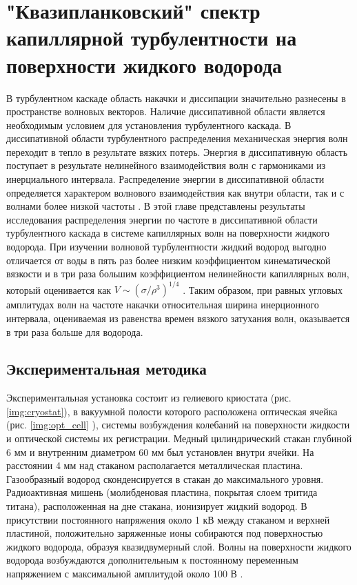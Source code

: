 \chapter{"Квазипланковский" спектр капиллярной турбулентности на поверхности жидкого водорода}


В турбулентном каскаде область накачки и диссипации значительно разнесены в пространстве волновых векторов. Наличие диссипативной области является необходимым условием для установления турбулентного каскада. В диссипативной области турбулентного распределения механическая энергия волн переходит в тепло в результате вязких потерь. Энергия в диссипативную область поступает в результате нелинейного взаимодействия волн с гармониками из инерциального интервала. Распределение энергии в диссипативной области определяется характером волнового взаимодействия как внутри области, так и с волнами более низкой частоты \cite{Ryzhenkova1990}. 
В этой главе представлены результаты исследования распределения энергии по частоте в диссипативной области турбулентного каскада в системе капиллярных волн на поверхности жидкого водорода. При изучении волновой турбулентности жидкий водород выгодно отличается от воды в пять раз более низким коэффициентом кинематической вязкости и в три раза большим коэффициентом нелинейности капиллярных волн, который оценивается как $V \sim (\sigma / \rho^3)^{1/4}$ . Таким образом, при равных угловых амплитудах волн на частоте накачки относительная ширина инерционного интервала, оцениваемая из равенства времен вязкого затухания волн, оказывается в три раза больше для водорода. 

\section{Экспериментальная методика} %
 Экспериментальная установка состоит из гелиевого криостата (рис. \ref{img:cryostat}), в вакуумной полости которого расположена оптическая ячейка (рис. \ref{img:opt_cell} ), системы возбуждения колебаний на поверхности жидкости и оптической системы их регистрации. Медный цилиндрический стакан глубиной 6 мм и внутренним диаметром 60 мм был установлен внутри ячейки. На расстоянии 4 мм над стаканом располагается металлическая пластина. Газообразный водород сконденсируется в стакан до максимального уровня. Радиоактивная мишень (молибденовая пластина, покрытая слоем тритида титана), расположенная на дне стакана, ионизирует жидкий водород. В присутствии постоянного напряжения около 1 кВ между стаканом и верхней пластиной, положительно заряженные ионы собираются под поверхностью жидкого водорода, образуя квазидвумерный слой. Волны на поверхности жидкого водорода возбуждаются дополнительным к постоянному переменным напряжением с максимальной амплитудой около 100 В \cite{Brazhnikov_IET}.
 
